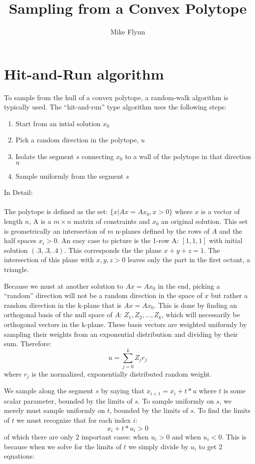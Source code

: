\documentclass{article}\usepackage{graphicx, color}
\begin{document}
\title{Sampling from a Convex Polytope}
\author{Mike Flynn}
\maketitle

\section*{Hit-and-Run algorithm}
To sample from the hull of a convex polytope, a random-walk algorithm
is typically used. The ``hit-and-run'' type algorithm uses the
following steps:

\begin{enumerate}
  \item Start from an intial solution $x_0$
  \item Pick a random direction in the polytope, $u$
  \item Isolate the segment $s$ connecting $x_0$ to a wall of the polytope
    in that direction $u$
  \item Sample uniformly from the segment $s$

\end{enumerate}


\noindent In Detail:
\\ \\
\noindent The polytope is defined as the set: $\{x| Ax = A x_0, x > 0\}$
where $x$ is a vector of length $n$, A is a $m \times n$ matrix of
constraints and $x_0$ an original solution. This set is geometrically
an intersection of $m$ n-planes defined by the rows of $A$ and the
half spaces $x_i > 0$. An easy case to picture is the 1-row A:
$[1,1,1]$ with initial solution $(.3,.3,.4)$. This corresponds the the
plane $x + y + z = 1$. The intersection of this plane with $x,y,z>0$
leaves only the part in the first octant, a triangle.

Because we must at another solution to $Ax = Ax_0$ in the end, picking
a ``random'' direction will not be a random direction in the space of
$x$ but rather a random direction in the k-plane that is
$Ax=Ax_0$. This is done by finding an orthogonal basis of the null
space of $A$: $Z_1, Z_2,\dots,Z_k$, which will necessarily be
orthogonal vectors in the k-plane. These basis vectors are weighted
uniformly by sampling their weights from an exponential distribution
and dividing by their sum. Therefore: $$ u = \sum_{j=0}^kZ_jr_j$$
where $r_j$ is the normalized, exponentially distributed random weight.

We sample along the segment $s$ by saying that $x_{i+1} = x_i + t*u$
where $t$ is some scalar parameter, bounded by the limits of $s$. To
sample uniformly on $s$, we merely must sample uniformly on $t$,
bounded by the limits of $s$. To find the limits of $t$ we must
recognize that for each index $i$: $$ x_i + t*u_i > 0 $$ of which
there are only 2 important cases: when $u_i > 0$ and when $u_i <
0$. This is because when we solve for the limits of $t$ we simply
divide by $u_i$ to get 2 equations:
\end{document}
